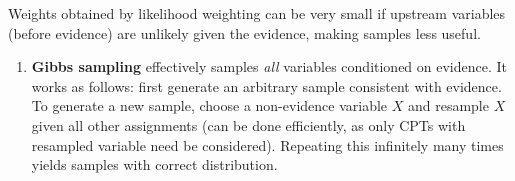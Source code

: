 \documentclass[10pt]{article}
\begin{document}
\begin{multicols}{2}
\begin{enumerate}
\begin{enumerate}
\begin{enumerate}
        \end{enumerate}
        Weights obtained by likelihood weighting can be very small if upstream variables (before evidence) are unlikely given the evidence, making samples less useful. 
        \begin{enumerate}
            \item \textbf{Gibbs sampling} effectively samples \textit{all} variables conditioned on evidence. It works as follows: first generate an arbitrary sample consistent with evidence. To generate a new sample, choose a non-evidence variable $X$ and resample $X$ given all other assignments (can be done efficiently, as only CPTs with resampled variable need be considered). Repeating this infinitely many times yields samples with correct distribution. 
        \end{enumerate}
    \end{enumerate}
    

\end{enumerate}
\end{multicols}
\end{document}
